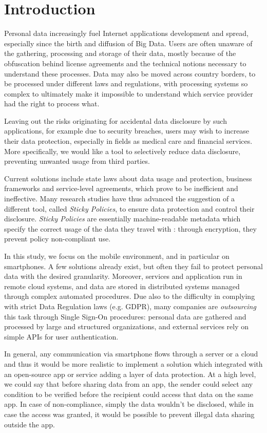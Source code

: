 \chapter{Introduction}
\label{Intro}
\thispagestyle{empty}

\noindent 
Personal data increasingly fuel Internet applications development and spread, especially since the birth and diffusion of Big Data. Users are often unaware of the gathering, processing and storage of their data, mostly because of the obfuscation behind license agreements and the technical notions necessary to understand these processes. Data may also be moved across country borders, to be processed under different laws and regulations, with processing systems so complex to ultimately make it impossible to understand which service provider had the right to process what.

Leaving out the risks originating for accidental data disclosure by such applications, for example due to security breaches, users may wish to increase their data protection, especially in fields as medical care and financial services. More specifically, we would like a tool to selectively reduce data disclosure, preventing unwanted usage from third parties.

Current solutions include state laws about data usage and protection, business frameworks and service-level agreements, which prove to be inefficient and ineffective. Many research studies have thus advanced the suggestion of a different tool, called \textit{Sticky Policies}, to ensure data protection and control their disclosure. \textit{Sticky Policies} are essentially machine-readable metadata which specify the correct usage of the data they travel with \cite{pearson2011sticky}: through encryption, they prevent policy non-compliant use.

In this study, we focus on the mobile environment, and in particular on smartphones. A few solutions already exist, but often they fail to protect personal data with the desired granularity. Moreover, services and application run in remote cloud systems, and data are stored in distributed systems managed through complex automated procedures. Due also to the difficulty in complying with strict Data Regulation laws (e.g. GDPR), many companies are \textit{outsourcing} this task through Single Sign-On procedures: personal data are gathered and processed by large and structured organizations, and external services rely on simple APIs for user authentication.

In general, any communication via smartphone flows through a server or a cloud and thus it would be more realistic to implement a solution which integrated with an open-source app or service adding a layer of data protection. At a high level, we could say that before sharing data from an app, the sender could select any condition to be verified before the recipient could access that data on the same app. In case of non-compliance, simply the data wouldn't be disclosed, while in case the access was granted, it would be possible to prevent illegal data sharing outside the app.

